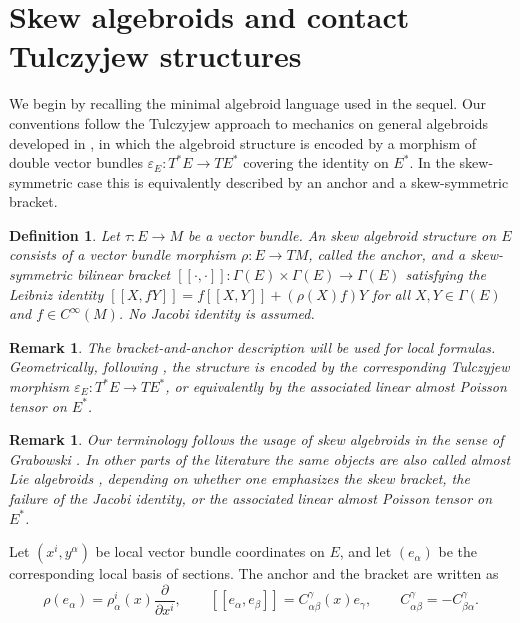 \documentclass[11pt]{article}
\newtheorem{definition}[theorem]{Definition}
\newtheorem{remark}[theorem]{Remark}
\begin{document}
\section{Skew algebroids and contact Tulczyjew structures}
\label{sec:almost}

We begin by recalling the minimal algebroid language used in the sequel. Our conventions follow the Tulczyjew approach to mechanics on general algebroids developed in \cite{GG2008}, in which the algebroid structure is encoded by a morphism of double vector bundles $\varepsilon_E: T^*E\rightarrow TE^{*}$ covering the identity on \(E^*\). In the skew-symmetric case this is
equivalently described by an anchor and a skew-symmetric bracket.

\begin{definition}
Let \(\tau:E\to M\) be a vector bundle. An \emph{skew algebroid structure}
on \(E\) consists of a vector bundle morphism $\rho:E\to TM$, called the anchor, and a skew-symmetric bilinear bracket $[\![\cdot,\cdot]\!]:\Gamma(E)\times\Gamma(E)\to\Gamma(E)$ satisfying the Leibniz identity $[\![X,fY]\!]=f[\![X,Y]\!]+(\rho(X)f)Y$ for all \(X,Y\in\Gamma(E)\) and \(f\in C^\infty(M)\). No Jacobi identity
is assumed.
\end{definition}

\begin{remark}
The bracket-and-anchor description will be used for local formulas. Geometrically,
following \cite{GG2008}, the structure is encoded by the corresponding Tulczyjew
morphism \(\varepsilon_E:T^*E\to TE^*\), or equivalently by the associated linear
almost Poisson tensor on \(E^*\).
\end{remark}

\begin{remark}
Our terminology follows the usage of skew algebroids in the sense of
Grabowski \cite{Grabowski2012Modular}. In other parts of the literature the same objects are
also called almost Lie algebroids \cite{GrabowskiJozwikowski2011}, depending on whether
one emphasizes the skew bracket, the failure of the Jacobi identity, or the
associated linear almost Poisson tensor on \(E^*\).
\end{remark}

Let \((x^i,y^\alpha)\) be local vector bundle coordinates on \(E\), and let
\((e_\alpha)\) be the corresponding local basis of sections. The anchor and
the bracket are written as
\[
        \rho(e_\alpha)
        =
        \rho^i_{\alpha}(x)\frac{\partial}{\partial x^i},
        \qquad
        [\![e_\alpha,e_\beta]\!]
        =
        C^\gamma_{\alpha\beta}(x)e_\gamma,
        \qquad
        C^\gamma_{\alpha\beta}=-C^\gamma_{\beta\alpha}.
\]
\end{document}
